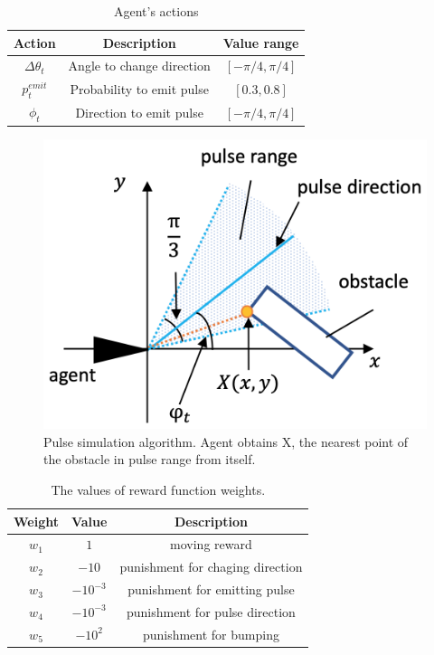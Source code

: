 \documentclass[../main]{subfiles}
\begin{document}
\newpage
{}
\begin{table}[H]
  \caption{Agent's actions}\label{tab:agent_actions}
  \centering
    \begin{tabular}{c|c|c}
      Action & Description & Value range \\ \hline
      $\Delta\theta_t$ & Angle to change direction & $[-\pi/4, \pi/4]$ \\
      $p^{emit}_t$ & Probability to emit pulse & $[0.3, 0.8]$ \\
      $\phi_t$ & Direction to emit pulse & $[-\pi/4, \pi/4]$ \\
    \end{tabular}
\end{table}


\newpage
{}
\begin{figure}[H]
  \centering
  \vfill
  \includegraphics[width=12cm]{figures/pulse_simulation.png}
  \caption{
    Pulse simulation algorithm. Agent obtains X,
    the nearest point of the obstacle in pulse range from itself.
  }\label{fig:pulse_simulation}
\end{figure}


\newpage
{}
\begin{table}[H]
  \caption{The values of reward function weights.}
  \label{tab:reward_weights}
  \centering
    \begin{tabular}{c|c|c}
      Weight & Value      & Description \\ \hline
      $w_1$  & $1$        & moving reward\\
      $w_2$  & $-10$      & punishment for chaging direction\\
      $w_3$  & $-10^{-3}$ & punishment for emitting pulse \\
      $w_4$  & $-10^{-3}$ & punishment for pulse direction\\
      $w_5$  & $-10^2$    & punishment for bumping\\
    \end{tabular}
\end{table}
\end{document}

